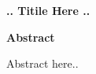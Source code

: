 \documentclass{article}
\begin{document}
\pagestyle{empty}
\thispagestyle{empty}

\begin{center}
    {\LARGE \bf \noindent .. Titile Here ..}
\end{center}

\vspace{0.2in}
{\bf \noindent Abstract}\\
\vspace{-0.1in}

\noindent Abstract here..
\end{document}
